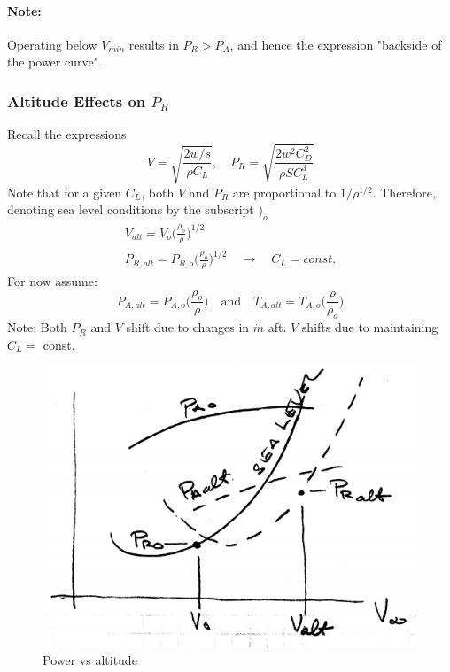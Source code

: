 \documentclass[draft=false, titlepage]{article}
\begin{document}
\paragraph*{Note:} Operating below $V_{min}$ results in $P_R>P_A$, and hence the expression "backside of the power curve".

\subsubsection{Altitude Effects on $P_R$}
Recall the expressions
\begin{equation}
V = \sqrt{\frac{2w/s}{\rho C_L}},\quad P_R = \sqrt{\frac{2w^2C_D^2}{\rho S C_L^3}}
\end{equation}
Note that for a given $C_L$, both $V$ and $P_R$ are proportional to $1/\rho^{1/2}$. Therefore, denoting sea level conditions by the subscript $\big)_o$
\begin{gather*}
V_{alt} = V_o \Big(\frac{\rho_o}{\rho}\Big)^{1/2}\\
P_{R,alt} = P_{R,o}\Big(\frac{\rho_o}{\rho}\Big)^{1/2} \quad\rightarrow\quad C_L = const.
\end{gather*}
For now assume:
\begin{equation}
P_{A,alt} = P_{A,o}\Big(\frac{\rho_o}{\rho}\Big) \quad \text{and}\quad T_{A,alt} = T_{A,o} \Big(\frac{\rho}{\rho_o}\Big)
\end{equation}
Note: Both $P_R$ and $V$ shift due to changes in $\dot{m}$ aft. $V$ shifts due to maintaining $C_L =$ const.
 \begin{figure}[ht]
	\centering
	\includegraphics[width=0.5\linewidth]{Figures/p76_PowerAltitude}
	\caption{Power vs altitude}
	\label{fig:p76_PowerAltitude}
\end{figure}
\end{document}
